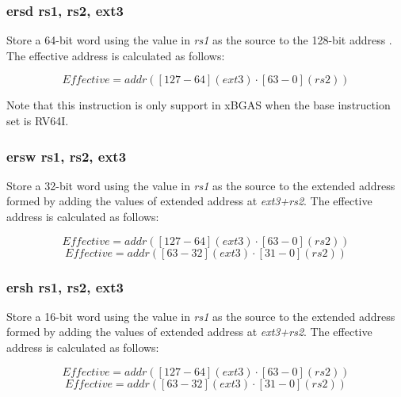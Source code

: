 \documentclass{article}
\begin{document}
\subsubsection{ersd rs1, rs2, ext3}

Store a 64-bit word using the value in \textit{rs1} as the source 
to the 128-bit address .  The effective address is calculated 
as follows: 

\begin{equation}
Effective = addr([127-64](ext3) \cdot [63-0](rs2))
\end{equation}

\begin{commentary}
Note that this instruction is only support in xBGAS when the base 
instruction set is RV64I.
\end{commentary}

\subsubsection{ersw rs1, rs2, ext3}

Store a 32-bit word using the value in \textit{rs1} as the source 
to the extended address formed by adding the values of
extended address at \textit{ext3+rs2}.  The effective address is calculated 
as follows: 

\begin{equation}
Effective = addr([127-64](ext3) \cdot [63-0](rs2))
\end{equation}
\begin{equation}
Effective = addr([63-32](ext3) \cdot [31-0](rs2))
\end{equation}

\subsubsection{ersh rs1, rs2, ext3}

Store a 16-bit word using the value in \textit{rs1} as the source 
to the extended address formed by adding the values of
extended address at \textit{ext3+rs2}.  The effective address is calculated 
as follows: 

\begin{equation}
Effective = addr([127-64](ext3) \cdot [63-0](rs2))
\end{equation}
\begin{equation}
Effective = addr([63-32](ext3) \cdot [31-0](rs2))
\end{equation}
\end{document}
